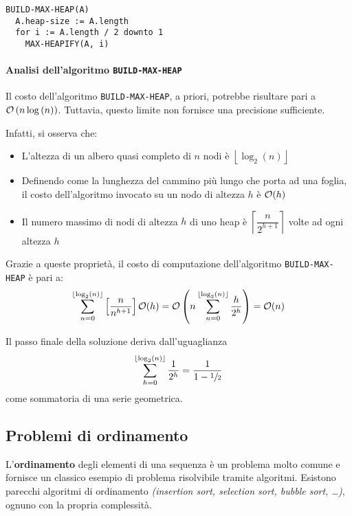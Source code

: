 \documentclass[italian, 10pt]{article}
\begin{document}
\begin{lstlisting}[style=pseudocode, caption={Algoritmo \texttt{BUILD-MAX-HEAP}}, label={lst:algoritmo-build-max-heap}]
BUILD-MAX-HEAP(A)
  A.heap-size := A.length
  for i := A.length / 2 downto 1
    MAX-HEAPIFY(A, i)
\end{lstlisting}

\paragraph{Analisi dell'algoritmo \texttt{BUILD-MAX-HEAP}}

Il costo dell'algoritmo \texttt{BUILD-MAX-HEAP}, a priori, potrebbe risultare pari a \(\mathcal{O}\left(n \log{(n)}\right)\).
Tuttavia, questo limite non fornisce una precisione sufficiente.

Infatti, si osserva che:

\begin{itemize}
  \item L'altezza di un albero quasi completo di \(n\) nodi è \(\left\lfloor \log_2(n) \right\rfloor\)
  \item Definendo come  la lunghezza del cammino più lungo che porta ad una foglia, il costo dell'algoritmo invocato su un nodo di altezza \(h\) è \(\mathcal{O}(h)\)
  \item Il numero massimo di nodi di altezza \(h\) di uno heap è \(\left\lceil \dfrac{n}{2^{h+1}} \right\rceil\) volte ad ogni altezza \(h\)
\end{itemize}

Grazie a queste proprietà, il costo di computazione dell'algoritmo \texttt{BUILD-MAX-HEAP} è pari a:
\[ \displaystyle \sum_{n=0}^{\left\lfloor \log_2(n) \right\rfloor} \left[ \dfrac{n}{n^{h+1}} \right] \mathcal{O}(h) = \mathcal{O} \left(n \displaystyle \sum_{n=0}^{\left\lfloor \log_2(n) \right\rfloor} \dfrac{h}{2^h} \right) = \mathcal{O} (n)\]

Il passo finale della soluzione deriva dall'uguaglianza
\[ \sum_{h=0}^{\left\lfloor \log_2(n) \right\rfloor} \dfrac{1}{2^h} = \dfrac{1}{1 - \sfrac{1}{2}} \]
come sommatoria di una serie geometrica.

\subsection{Problemi di ordinamento}

L'\textbf{ordinamento} degli elementi di una sequenza è un problema molto comune e fornisce un classico esempio di problema risolvibile tramite algoritmi.
Esistono parecchi algoritmi di ordinamento \textit{(insertion sort, selection sort, bubble sort, \ldots)}, ognuno con la propria complessità.
\end{document}
